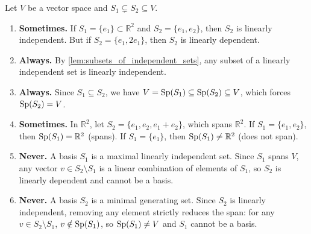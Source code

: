 \begin{exercisesolution*}
\label{sol:monotonicity_independence_spanning_mc}
Let $V$ be a vector space and $S_1 \subsetneq S_2 \subseteq V$.

\begin{enumerate}[label=\textbf{(\arabic*)}]
    \item \textbf{Sometimes.} If $S_1 = \{e_1\} \subset \mathbb{R}^2$ and $S_2 = \{e_1, e_2\}$, then $S_2$ is linearly independent. But if $S_2 = \{e_1, 2e_1\}$, then $S_2$ is linearly dependent.
    \item \textbf{Always.} By \cref{lem:subsets_of_independent_sets}, any subset of a linearly independent set is linearly independent.
    \item \textbf{Always.} Since $S_1 \subseteq S_2$, we have $V = \operatorname{Sp}(S_1) \subseteq \operatorname{Sp}(S_2) \subseteq V$, which forces $\operatorname{Sp}(S_2) = V$.
    \item \textbf{Sometimes.} In $\mathbb{R}^2$, let $S_2 = \{e_1, e_2, e_1 + e_2\}$, which spans $\mathbb{R}^2$. If $S_1 = \{e_1, e_2\}$, then $\operatorname{Sp}(S_1) = \mathbb{R}^2$ (spans). If $S_1 = \{e_1\}$, then $\operatorname{Sp}(S_1) \ne \mathbb{R}^2$ (does not span).
    \item \textbf{Never.} A basis $S_1$ is a maximal linearly independent set. Since $S_1$ spans $V$, any vector $v \in S_2 \setminus S_1$ is a linear combination of elements of $S_1$, so $S_2$ is linearly dependent and cannot be a basis.
    \item \textbf{Never.} A basis $S_2$ is a minimal generating set. Since $S_2$ is linearly independent, removing any element strictly reduces the span: for any $v \in S_2 \setminus S_1$, $v \notin \operatorname{Sp}(S_1)$, so $\operatorname{Sp}(S_1) \ne V$ and $S_1$ cannot be a basis.
\end{enumerate}
\end{exercisesolution*}
